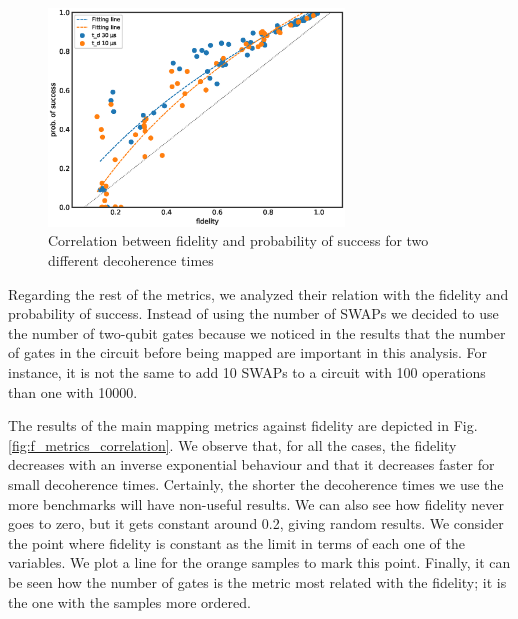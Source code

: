 \begin{figure}[htbp]
\centering
\includegraphics[width=0.7\textwidth]{figures/f_ps_correlation.eps}
\caption{\label{fig:f_ps_correlation_with_meas_error}
Correlation between fidelity and probability of success for two different decoherence times}
\end{figure}



Regarding the rest of the metrics, we analyzed their relation with the fidelity and probability of success.
Instead of using the number of SWAPs we decided to use the number of two-qubit gates because we noticed in the results that the number of gates in the circuit before being mapped are important in this analysis.
For instance, it is not the same to add 10 SWAPs to a circuit with 100 operations than one with 10000.


The results of the main mapping metrics against fidelity are depicted in Fig. \ref{fig:f_metrics_correlation}.
We observe that, for all the cases, the fidelity decreases with an inverse exponential behaviour and that it decreases faster for small decoherence times.
Certainly, the shorter the decoherence times we use the more benchmarks will have non-useful results.
We can also see how fidelity never goes to zero, but it gets constant around 0.2, giving random results.
We consider the point where fidelity is constant as the limit in terms of each one of the variables.
We plot a line for the orange samples to mark this point.
Finally, it can be seen how the number of gates is the metric most related with the fidelity; it is the one with the samples more ordered.

